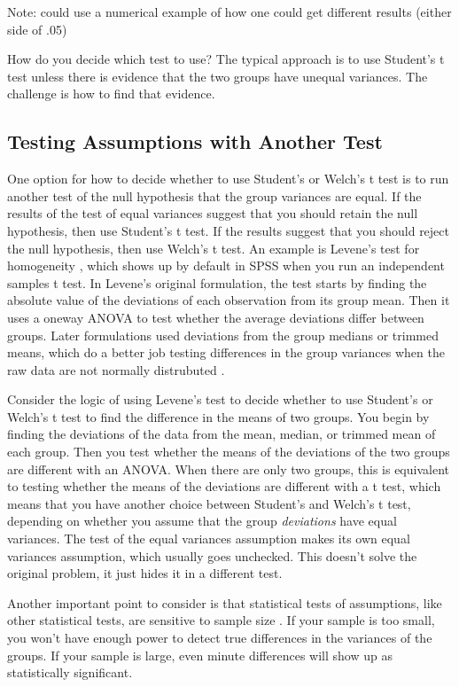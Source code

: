 \documentclass[man,a4paper,noextraspace,apacite]{apa6}
\begin{document}
    Note: could use a numerical example of how one could get different results 
(either side of .05)
    
    How do you decide which test to use? The typical approach is to use 
Student's t test unless there is evidence that the two groups have unequal 
variances. The challenge is how to find that evidence. 

\subsection{Testing Assumptions with Another Test}
    One option for how to decide whether to use Student's or Welch's t test 
is to run another test of the null hypothesis that the group variances 
are equal. If the results of the test of equal variances suggest that you should
retain the null hypothesis, then use Student's t test. If the results suggest
that you should reject the null hypothesis, then use Welch's t test.
An example is Levene's test for homogeneity \cite{Levene1960}, which shows up by default in SPSS when you run an independent samples t test.
In Levene's original formulation, the test starts by finding the absolute value of the deviations of each observation from its group mean. 
Then it uses a oneway ANOVA to test whether the average deviations differ between groups.
Later formulations used deviations from the group medians or trimmed means, which do a better job 
testing differences in the group variances when the raw data are not normally distrubuted \cite{Brown1974}.

Consider the logic of using Levene's test to decide whether to use Student's or Welch's t 
test to find the difference in the means of two groups. You begin by finding the 
deviations of the data from the mean, median, or trimmed mean of each group. Then you test 
whether the means of the deviations of the two groups are different with an ANOVA.
When there are only two groups, this is equivalent to testing whether the means of
the deviations are different with a t test, which means that you have another choice
between Student's and Welch's t test, depending on whether you assume that the
group \textit{deviations} have equal variances. The test of the equal variances assumption
makes its own equal variances assumption, which usually goes unchecked.
This doesn't solve the original problem, it just hides it in a different test. 

Another important point to consider is that statistical tests of assumptions,
like other statistical tests, are sensitive 
to sample size \cite{Gonzalez2008}. If your sample is too small, you won't have enough power to 
detect true differences in the variances of the groups. If your sample is 
large, even minute differences will show up as statistically significant. 
\end{document}
